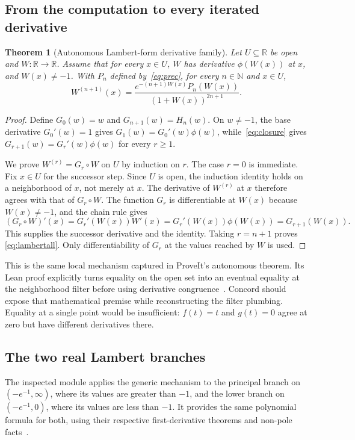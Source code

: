 \documentclass[11pt,a4paper]{article}
\newcommand{\R}{\mathbb R}
\newcommand{\N}{\mathbb N}
\newtheorem{theorem}[proposition]{Theorem}
\theoremstyle{remark}
\begin{document}
\subsection{From the computation to every iterated derivative}
\begin{theorem}[Autonomous Lambert-form derivative family]
Let $U\subseteq\R$ be open and $W:\R\to\R$. Assume that for every $x\in U$,
$W$ has derivative $\phi(W(x))$ at $x$, and $W(x)\ne-1$. With $P_n$ defined
by~\eqref{eq:prec}, for every $n\in\N$ and $x\in U$,
\begin{equation}
 W^{(n+1)}(x)=
 \frac{e^{-(n+1)W(x)}P_n(W(x))}{(1+W(x))^{2n+1}}.
 \label{eq:lambertall}
\end{equation}
\end{theorem}
\begin{proof}
Define $G_0(w)=w$ and $G_{n+1}(w)=H_n(w)$. On $w\ne-1$, the base derivative
$G_0'(w)=1$ gives $G_1(w)=G_0'(w)\phi(w)$, while~\eqref{eq:closure} gives
$G_{r+1}(w)=G_r'(w)\phi(w)$ for every $r\ge1$.

We prove $W^{(r)}=G_r\circ W$ on $U$ by induction on $r$. The case $r=0$ is
immediate. Fix $x\in U$ for the successor step. Since $U$ is open, the induction
identity holds on a neighborhood of $x$, not merely at $x$. The derivative of
$W^{(r)}$ at $x$ therefore agrees with that of $G_r\circ W$. The function $G_r$
is differentiable at $W(x)$ because $W(x)\ne-1$, and the chain rule gives
\[
 (G_r\circ W)'(x)=G_r'(W(x))W'(x)
                =G_r'(W(x))\phi(W(x))
                =G_{r+1}(W(x)).
\]
This supplies the successor derivative and the identity. Taking $r=n+1$ proves
\eqref{eq:lambertall}. Only differentiability of $G_r$ at the values reached by
$W$ is used.
\end{proof}

This is the same local mechanism captured in ProveIt's autonomous theorem. Its
Lean proof explicitly turns equality on the open set into an eventual equality
at the neighborhood filter before using derivative congruence~\cite{pautonomous}.
Concord should expose that mathematical premise while reconstructing the filter
plumbing. Equality at a single point would be insufficient: $f(t)=t$ and $g(t)=0$
agree at zero but have different derivatives there.

\subsection{The two real Lambert branches}
The inspected module applies the generic mechanism to the principal branch on
$(-e^{-1},\infty)$, where its values are greater than $-1$, and the lower branch
on $(-e^{-1},0)$, where its values are less than $-1$. It provides the same
polynomial formula for both, using their respective first-derivative theorems
and non-pole facts~\cite{plambert}.
\end{document}
